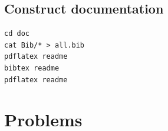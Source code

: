 \documentclass{book}
\begin{document}
\subsection*{Construct documentation}

\begin{verbatim}
cd doc
cat Bib/* > all.bib
pdflatex readme
bibtex readme
pdflatex readme
\end{verbatim}


\section*{Problems}
\end{document}
